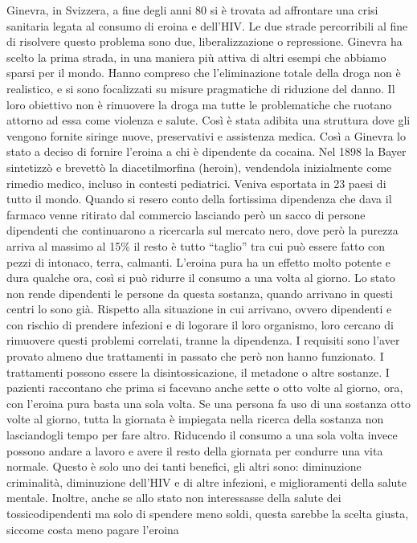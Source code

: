 \documentclass[12pt]{book} %
\begin{document}
\begin{mdframed}[linewidth=1pt]
Ginevra, in Svizzera, a fine degli anni 80 si è trovata ad affrontare una crisi sanitaria legata al consumo di eroina e dell'HIV. Le due
strade percorribili al fine di risolvere questo problema sono due, liberalizzazione o repressione. Ginevra ha scelto la
prima strada, in una maniera più attiva di altri esempi che abbiamo sparsi per il mondo. Hanno compreso che l’eliminazione totale della droga non è realistico, e si sono focalizzati su misure pragmatiche di riduzione del danno. 
Il loro obiettivo non è rimuovere la droga ma tutte le problematiche che ruotano
attorno ad essa come violenza e salute. Così è stata adibita una struttura dove gli vengono fornite siringe nuove,
preservativi e assistenza medica. Così a Ginevra lo stato a deciso di fornire l'eroina a chi è dipendente da cocaina. Nel 1898 la Bayer sintetizzò e brevettò la diacetilmorfina (heroin), vendendola inizialmente come rimedio medico, incluso in contesti pediatrici. Veniva esportata in 23 paesi di tutto il mondo. Quando si resero conto della fortissima
dipendenza che dava il farmaco venne ritirato dal commercio lasciando però un sacco di persone dipendenti che
continuarono a ricercarla sul mercato nero, dove però la purezza arriva al massimo al 15\% il resto è tutto “taglio”
tra cui può essere fatto con pezzi di intonaco, terra, calmanti. L'eroina pura ha un effetto molto potente e dura qualche ora, così si può ridurre il consumo a una volta al giorno. Lo stato non rende dipendenti le persone da questa sostanza, quando arrivano in questi centri lo sono già. Rispetto alla
situazione in cui arrivano, ovvero dipendenti e con rischio di prendere infezioni e di logorare il loro organismo, loro
cercano di rimuovere questi problemi correlati, tranne la dipendenza. I requisiti sono l'aver provato almeno due trattamenti in passato che però non hanno funzionato. I trattamenti possono essere la disintossicazione, il metadone o altre sostanze. I pazienti raccontano che prima si facevano anche sette o otto volte al giorno, ora, con l'eroina
pura basta una sola volta. Se una persona fa uso di una sostanza otto volte al giorno, tutta la giornata è impiegata
nella ricerca della sostanza non lasciandogli tempo per fare altro. Riducendo il consumo a una sola volta invece possono
andare a lavoro e avere il resto della giornata per condurre una vita normale. Questo è solo uno dei tanti benefici, gli altri sono: diminuzione criminalità, diminuzione dell'HIV e di altre infezioni, e miglioramenti della salute mentale. Inoltre, anche se allo stato non interessasse della salute dei tossicodipendenti ma
solo di spendere meno soldi, questa sarebbe la scelta giusta, siccome costa meno pagare l'eroina

\end{mdframed}
\end{document}
